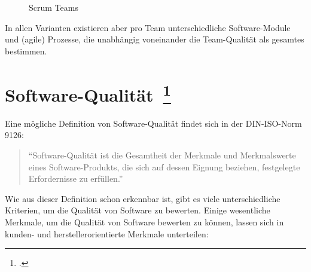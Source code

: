 \begin{savenotes}
  \begin{figure}[H]
    \centering
  \caption{Scrum Teams}\label{fig:Scrum Teams}
  \end{figure}
\end{savenotes}

In allen Varianten existieren aber pro Team unterschiedliche Software-Module und (agile) Prozesse, die unabhängig voneinander die Team-Qualität als gesamtes bestimmen.

\clearpage
\section[Software-Qualität]{Software-Qualität~\footcite[vgl.][Kapitel 1.2]{hoffmann_software_qualitat_2013}}

Eine mögliche Definition von Software-Qualität findet sich in der DIN-ISO-Norm 9126:

\begin{quote}
  ``Software-Qualität ist die Gesamtheit der Merkmale und Merkmalswerte eines Software-Produkts, die sich auf dessen Eignung beziehen, festgelegte Erfordernisse zu erfüllen.''
\end{quote}

Wie aus dieser Definition schon erkennbar ist, gibt es viele unterschiedliche Kriterien, um die Qualität von Software zu bewerten.
Einige wesentliche Merkmale, um die Qualität von Software bewerten zu können, lassen sich in kunden- und herstellerorientierte Merkmale unterteilen:


